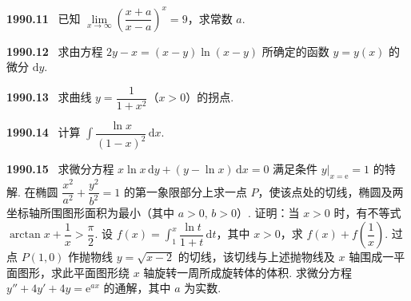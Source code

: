 \documentclass[UTF8,12pt]{ctexart}
\newcommand{\qn}[1]{\textbf{\large #1}\ }
\begin{document}
\vfill
\newpage
\qn{1990.11}
已知 $\lim\limits_{x\to\infty}\left(\dfrac{x+a}{x-a}\right)^x=9$，求常数 $a$.

\vfill
\newpage
\qn{1990.12}
求由方程 $2y-x=(x-y)\ln(x-y)$ 所确定的函数 $y=y(x)$ 的微分 $\mathrm{d}y$.

\vfill
\newpage
\qn{1990.13}
求曲线 $y=\dfrac{1}{1+x^2}$（$x>0$）的拐点.

\vfill
\newpage
\qn{1990.14}
计算 $\int\dfrac{\ln x}{(1-x)^2}\,\mathrm{d}x$.

\vfill
\newpage
\qn{1990.15}
求微分方程 $x\ln x\,\mathrm{d}y+(y-\ln x)\,\mathrm{d}x=0$ 满足条件 $\left.y\right|_{x=\mathrm{e}}=1$ 的特解.
在椭圆 $\dfrac{x^2}{a^2}+\dfrac{y^2}{b^2}=1$ 的第一象限部分上求一点 $P$，使该点处的切线，椭圆及两坐标轴所围图形面积为最小（其中 $a>0,\,b>0$）.
证明：当 $x>0$ 时，有不等式 $\arctan x+\dfrac{1}{x}>\dfrac{\pi}{2}$.
设 $f(x)=\int_1^x\dfrac{\ln t}{1+t}\,\mathrm{d}t$，其中 $x>0$，求 $f(x)+f\left(\dfrac{1}{x}\right)$.
过点 $P(1,0)$ 作抛物线 $y=\sqrt{x-2}$ 的切线，该切线与上述抛物线及 $x$ 轴围成一平面图形，求此平面图形绕 $x$ 轴旋转一周所成旋转体的体积.
求微分方程 $y''+4y'+4y=\mathrm{e}^{ax}$ 的通解，其中 $a$ 为实数.

\vfill
\newpage
\end{document}
